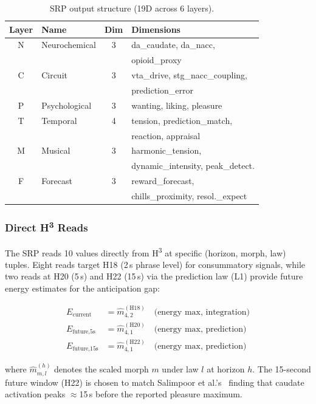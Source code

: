 \documentclass[10pt,twocolumn]{article}
\newcommand{\Htri}{H\textsuperscript{3}}
\begin{document}
\begin{table}[t]
\centering
\caption{SRP output structure (19D across 6 layers).}
\label{tab:srp}
\small
\begin{tabular}{@{}clcl@{}}
\toprule
\textbf{Layer} & \textbf{Name} & \textbf{Dim} & \textbf{Dimensions} \\
\midrule
N & Neurochemical & 3 & da\_caudate, da\_nacc, \\
  &               &   & opioid\_proxy \\
C & Circuit & 3 & vta\_drive, stg\_nacc\_coupling, \\
  &         &   & prediction\_error \\
P & Psychological & 3 & wanting, liking, pleasure \\
T & Temporal & 4 & tension, prediction\_match, \\
  &          &   & reaction, appraisal \\
M & Musical & 3 & harmonic\_tension, \\
  &         &   & dynamic\_intensity, peak\_detect. \\
F & Forecast & 3 & reward\_forecast, \\
  &          &   & chills\_proximity, resol.\_expect \\
\bottomrule
\end{tabular}
\end{table}

\subsubsection{Direct \Htri{} Reads}

The SRP reads 10 values directly from \Htri{} at specific (horizon, morph, law) tuples. Eight reads target H18 (2\,s phrase level) for consummatory signals, while two reads at H20 (5\,s) and H22 (15\,s) via the prediction law (L1) provide future energy estimates for the anticipation gap:

\begin{align}
E_\text{current} &= \hat{m}_{4,2}^{(\text{H18})} \quad \text{(energy max, integration)} \\
E_\text{future,5s} &= \hat{m}_{4,1}^{(\text{H20})} \quad \text{(energy max, prediction)} \\
E_\text{future,15s} &= \hat{m}_{4,1}^{(\text{H22})} \quad \text{(energy max, prediction)}
\end{align}

\noindent where $\hat{m}_{m,l}^{(h)}$ denotes the scaled morph $m$ under law $l$ at horizon $h$. The 15-second future window (H22) is chosen to match Salimpoor et al.'s~\cite{Salimpoor2011} finding that caudate activation peaks $\approx$15\,s before the reported pleasure maximum.
\end{document}
